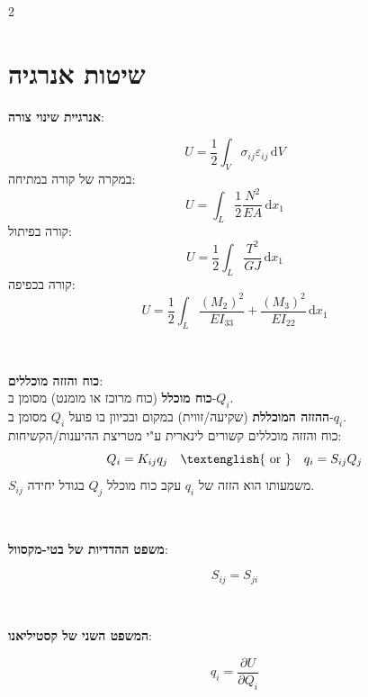 \documentclass{article}
\renewcommand\text[1]{\textnormal{\textenglish{#1}}}
\newenvironment{cheatformula}[1][כותרת]{
    \begin{minipage}{\linewidth}
    \textbf{#1}:
}{
    \end{minipage}\\[2ex]
}
\begin{document}
\begin{multicols*}{2}
\section{שיטות אנרגיה}
\begin{cheatformula}[אנרגיית שינוי צורה]
    $$U=\dfrac{1}{2}\int _{V} \sigma_{ij}\varepsilon_{ij} \, \mathrm{d}V$$
    במקרה של קורה במתיחה:
    $$U=\int _{L} \dfrac{1}{2} \dfrac{N^{2}}{EA} \, \mathrm{d}{x}_{1}$$
    קורה בפיתול:
    $$U=\dfrac{1}{2}\int _{L} \dfrac{T^{2}}{GJ} \, \mathrm{d}{x}_{1} $$
    קורה בכפיפה:
    $$U =\dfrac{1}{2}\int _{L}  \dfrac{({M}_{2})^{2}}{E{I}_{33}} +\dfrac{({M}_{3})^{2}}{E{I}_{22}} \, \mathrm{d}{x}_{1}$$
\end{cheatformula}
\begin{cheatformula}[כוח והזזה מוכללים]\\
    \textbf{כוח מוכלל} (כוח מרוכז או מומנט) מסומן ב-$Q_i$.\\
   \textbf{ ההזזה המוכללת} (שקיעה/זווית) במקום ובכיוון בו פועל $Q_i$ מסומן ב-$q_i$.\\
   כוח והזזה מוכללים קשורים לינארית ע"י מטריצת ההיענות/הקשיחות:
   $$Q_{i}=K_{ij}q_{j} \quad \text{ or } \quad q_{i}=S_{ij}Q_{j}$$
   $S_{ij}$ משמעותו הוא הזזה של $q_{i}$ עקב כוח מוכלל $Q_{j}$ בגודל יחידה.
\end{cheatformula}
\begin{cheatformula}[משפט ההדדיות של בטי-מקסוול]
    $$S_{ij}=S_{ji}$$
\end{cheatformula}
\begin{cheatformula}[המשפט השני של קסטיליאנו]
    $$q_i=\dfrac{ \partial U }{ \partial Q_{i} }$$
\end{cheatformula}


\end{multicols*}
\newpage
\printnotes
\end{document}
